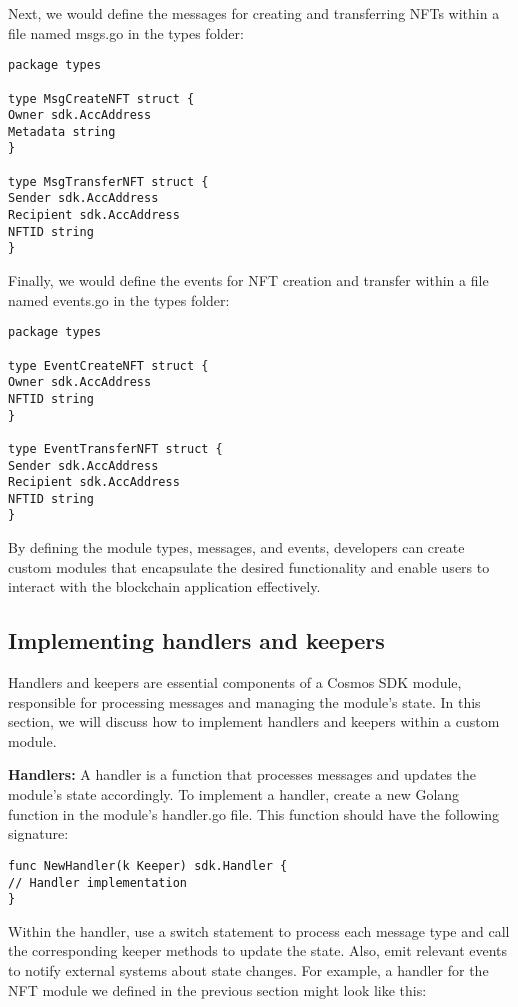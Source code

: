 \documentclass{article}
\begin{document}
Next, we would define the messages for creating and transferring NFTs within a file named msgs.go in the types folder:

\begin{lstlisting}[language=Golang]
package types

type MsgCreateNFT struct {
Owner sdk.AccAddress
Metadata string
}

type MsgTransferNFT struct {
Sender sdk.AccAddress
Recipient sdk.AccAddress
NFTID string
}
\end{lstlisting}

Finally, we would define the events for NFT creation and transfer within a file named events.go in the types folder:

\begin{lstlisting}[language=Golang]
package types

type EventCreateNFT struct {
Owner sdk.AccAddress
NFTID string
}

type EventTransferNFT struct {
Sender sdk.AccAddress
Recipient sdk.AccAddress
NFTID string
}
\end{lstlisting}

By defining the module types, messages, and events, developers can create custom modules that encapsulate the desired functionality and enable users to interact with the blockchain application effectively.
\subsection{Implementing handlers and keepers}

Handlers and keepers are essential components of a Cosmos SDK module, responsible for processing messages and managing the module's state. In this section, we will discuss how to implement handlers and keepers within a custom module.

\textbf{Handlers:} A handler is a function that processes messages and updates the module's state accordingly. To implement a handler, create a new Golang function in the module's handler.go file. This function should have the following signature:

\begin{lstlisting}[language=Golang]
func NewHandler(k Keeper) sdk.Handler {
// Handler implementation
}
\end{lstlisting}

Within the handler, use a switch statement to process each message type and call the corresponding keeper methods to update the state. Also, emit relevant events to notify external systems about state changes. For example, a handler for the NFT module we defined in the previous section might look like this:
\end{document}
